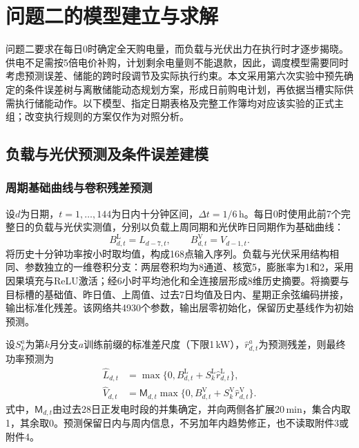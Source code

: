 \section{问题二的模型建立与求解}\label{sec:q2-exp006}

问题二要求在每日0时确定全天购电量，而负载与光伏出力在执行时才逐步揭晓。供电不足需按5倍电价补购，计划剩余电量则不能退款，因此，调度模型需要同时考虑预测误差、储能的跨时段调节及实际执行约束。本文采用第六次实验中预先确定的条件误差树与离散储能动态规划方案，形成日前购电计划，再依据当槽实际供需执行储能动作。以下模型、指定日期表格及完整工作簿均对应该实验的正式主组；改变执行规则的方案仅作为对照分析。

\subsection{负载与光伏预测及条件误差建模}
\subsubsection{周期基础曲线与卷积残差预测}

设$d$为日期，$t=1,\ldots,144$为日内十分钟区间，$\Delta t=1/6$\,h。每日0时使用此前7个完整日的负载与光伏实测值，分别以负载上周同期和光伏昨日同期作为基础曲线：
\begin{equation}\label{eq:q2-base}
 B^{\mathrm L}_{d,t}=L_{d-7,t},\qquad B^{\mathrm V}_{d,t}=V_{d-1,t}.
\end{equation}
将历史十分钟功率按小时取均值，构成168点输入序列。负载与光伏采用结构相同、参数独立的一维卷积分支：两层卷积均为8通道、核宽5，膨胀率为1和2，采用因果填充与ReLU激活；经6小时平均池化和全连接层形成8维历史摘要。将摘要与目标槽的基础值、昨日值、上周值、过去7日均值及日内、星期正余弦编码拼接，输出标准化残差。该网络共4930个参数，输出层零初始化，保留历史基线作为初始预测。

设$S_k^a$为第$k$月分支$a$训练前缀的标准差尺度（下限1\,kW），$\widehat r^a_{d,t}$为预测残差，则最终功率预测为
\begin{equation}\label{eq:q2-forecast}
 \begin{aligned}
 \widehat L_{d,t}&=\max\{0,B^{\mathrm L}_{d,t}+S_k^{\mathrm L}\widehat r^{\mathrm L}_{d,t}\},\\
 \widehat V_{d,t}&=\mathsf M_{d,t}\max\{0,B^{\mathrm V}_{d,t}+S_k^{\mathrm V}\widehat r^{\mathrm V}_{d,t}\}.
 \end{aligned}
\end{equation}
式中，$\mathsf M_{d,t}$由过去28日正发电时段的并集确定，并向两侧各扩展20\,min，集合内取1，其余取0。预测保留日内与周内信息，不另加年内趋势修正，也不读取附件3或附件4。

